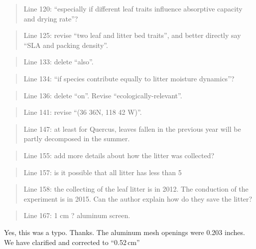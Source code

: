 \documentclass[letterpaper, 12pt]{letter}
\begin{document}
\begin{letter}{}
\begin{quote}
Line 120: “especially if different leaf traits influence absorptive capacity and drying rate”?
\end{quote}

\begin{quote}
Line 125: revise “two leaf and litter bed traits”, and better directly say “SLA and packing density”.
\end{quote}

\begin{quote}
Line 133: delete “also”.
\end{quote}

\begin{quote}
Line 134: “if species contribute equally to litter moisture dynamics”?
\end{quote}

\begin{quote}
Line 136: delete “on”. Revise “ecologically-relevant”.
\end{quote}

\begin{quote}
Line 141: revise “(36 36N, 118 42 W)”.
\end{quote}

\begin{quote}
Line 147: at least for Quercus, leaves fallen in the previous year will be partly decomposed in the summer.
\end{quote}

\begin{quote}
Line 155: add more details about how the litter was collected?
\end{quote}

\begin{quote}
Line 157: is it possible that all litter has less than 5%
\end{quote}

\begin{quote}
Line 158: the collecting of the leaf litter is in 2012. The conduction of the experiment is in 2015. Can the author explain how do they save the litter?
\end{quote}

\begin{quote}
Line 167: 1 cm ? aluminum screen.
\end{quote}

Yes, this was a typo. Thanks. The aluminum mesh openings were 0.203 inches. We have clarified and corrected to ``0.52\,cm'' 


\end{letter}
\end{document}
